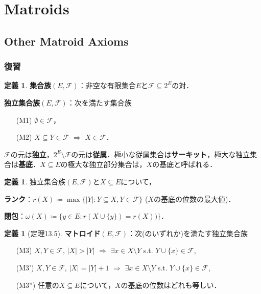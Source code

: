 \documentclass[xelatex,ja=standard,a4paper,14pt,everyparhook=compat]{bxjsarticle}
\theoremstyle{definition}
\newtheorem{definition}[theorem]{定義}
\begin{document}
\setcounter{section}{12}
\section{Matroids}
\setcounter{subsection}{1}
\subsection{Other Matroid Axioms}

\subsubsection*{復習}

\begin{definition}
    \textbf{集合族}$(E, \mathcal{F})$：非空な有限集合$E$と$\mathcal{F} \subseteq 2^E$の対．

    \textbf{独立集合族}$(E, \mathcal{F})$：次を満たす集合族 \begin{enumerate}
        \item[(M1)] $\emptyset \in \mathcal{F}$，
        \item[(M2)] $X \subseteq Y \in \mathcal{F}$ $\Rightarrow$ $X \in \mathcal{F}$．
    \end{enumerate}
    $\mathcal{F}$の元は\textbf{独立}，$2^E \setminus \mathcal{F}$の元は\textbf{従属}．極小な従属集合は\textbf{サーキット}，極大な独立集合は\textbf{基底}．$X \subseteq E$の極大な独立部分集合は，$X$の基底と呼ばれる．
\end{definition}

\begin{definition}
    独立集合族$(E, \mathcal{F})$と$X \subseteq E$について，

    \textbf{ランク}：$r(X) \coloneqq \max\{|Y| : Y \subseteq X, Y \in \mathcal{F}\}$ ($X$の基底の位数の最大値)．

    \textbf{閉包}：$\omega(X) \coloneqq \{y \in E : r(X \cup \{y\}) = r(X))\}$．
\end{definition}

\begin{definition}[定理13.5]
    \textbf{マトロイド}$(E, \mathcal{F})$：次(のいずれか)を満たす独立集合族 \begin{enumerate}
        \item[(M3)] $X, Y \in \mathcal{F}$, $|X| > |Y|$ $\Longrightarrow$ $\exists x \in X \setminus Y$ s.t. $Y \cup \{x\} \in \mathcal{F}$,
        \item[(M3')] $X, Y \in \mathcal{F}$, $|X| = |Y| + 1$ $\Longrightarrow$ $\exists x \in X \setminus Y$ s.t. $Y \cup \{x\} \in \mathcal{F}$,
        \item[(M3'')] 任意の$X \subseteq E$について，$X$の基底の位数はどれも等しい．
    \end{enumerate}
\end{definition}
\end{document}
